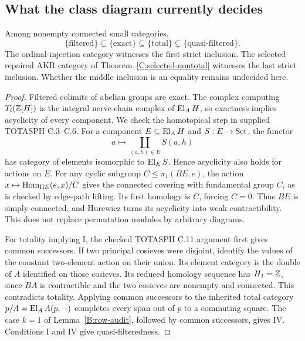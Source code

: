 \subsection{What the class diagram currently decides}
\begin{proposition}\label{D:known-diagram}
Among nonempty connected small categories,
\[
 \{\text{filtered}\}\subsetneq\{\text{exact}\}
 \subseteq\{\text{total}\}\subsetneq\{\text{quasi-filtered}\}.
\]
The ordinal-injection category witnesses the first strict inclusion.
The selected repaired AKR category of
Theorem~\ref{C:selected-nontotal} witnesses the last strict inclusion.
Whether the middle inclusion is an equality remains undecided here.
\end{proposition}
\begin{proof}
Filtered colimits of abelian groups are exact. The complex computing
$T_i(\mathbb Z[H])$ is the integral nerve-chain complex of $\operatorname{El}_AH$, so
exactness implies acyclicity of every component. We check the
homotopical step in supplied TOTASPH C.3--C.6. For a component
$E\subseteq\operatorname{El}_AH$ and $S:E\to\mathrm{Set}$, the functor
\[
 a\longmapsto\coprod_{(a,h)\in E}S(a,h)
\]
has category of elements isomorphic to $\operatorname{El}_E S$. Hence acyclicity
also holds for actions on $E$. For any cyclic subgroup
$C\leq\pi_1(BE,e)$, the action
$x\mapsto\operatorname{Hom}_{\Pi E}(e,x)/C$ gives the connected covering with
fundamental group $C$, as is checked by edge-path lifting. Its first
homology is $C$, forcing $C=0$. Thus $BE$ is simply connected,
and Hurewicz turns its acyclicity into weak contractibility. This
does not replace permutation modules by arbitrary diagrams.

For totality implying I, the checked TOTASPH C.11 argument first
gives common successors. If two principal cosieves were disjoint,
identify the values of the constant two-element action on their
union. Its element category is the double of $A$ identified on
those cosieves. Its reduced homology sequence has $H_1=\mathbb Z$,
since $BA$ is contractible and the two cosieves are nonempty and
connected. This contradicts totality. Applying common successors
to the inherited total category $p/A=\operatorname{El}_A A(p,-)$ completes
every span out of $p$ to a commuting square. The case $k=1$ of
Lemma~\ref{B:row-audit}, followed by common successors, gives
IV. Conditions I and IV give quasi-filteredness.


\end{proof}

